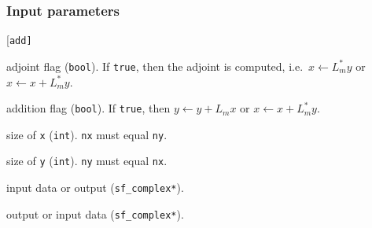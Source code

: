 \subsubsection*{Input parameters}
\begin{desclist}{\tt }{\quad}[\tt add]
   \setlength\itemsep{0pt}
   \item[adj] adjoint flag (\texttt{bool}). If \texttt{true}, then the adjoint is computed, i.e.~$x\leftarrow L_m^*y$ or $x\leftarrow x+L_m^*y$. 
   \item[add] addition flag (\texttt{bool}). If \texttt{true}, then $y\leftarrow y+L_mx$ or $x\leftarrow x+L_m^*y$.  
   \item[nx]  size of \texttt{x} (\texttt{int}). \texttt{nx} must equal \texttt{ny}. 
   \item[ny]  size of \texttt{y} (\texttt{int}). \texttt{ny} must equal \texttt{nx}. 
   \item[x]   input data or output (\texttt{sf\_complex*}).
   \item[y]   output or input data (\texttt{sf\_complex*}).
\end{desclist}



